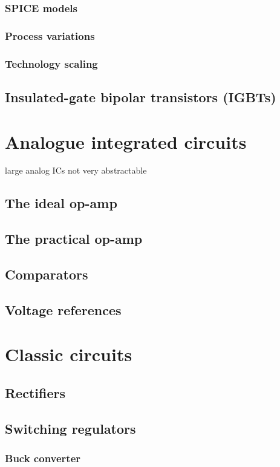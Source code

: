 \documentclass{report}
\begin{document}
\subsection{SPICE models}

\subsection{Process variations}
\subsection{Technology scaling}



\section{Insulated-gate bipolar transistors (IGBTs)}

\chapter{Analogue integrated circuits}
large analog ICs not very abstractable
\section{The ideal op-amp}
\section{The practical op-amp}
\section{Comparators}
\section{Voltage references}

\chapter{Classic circuits}
\section{Rectifiers}
\section{Switching regulators}
\subsection{Buck converter}
\end{document}
